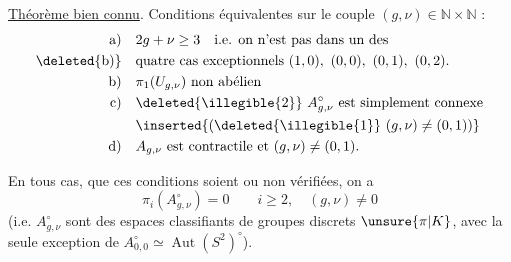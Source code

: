 

\uline{Théorème bien connu}. Conditions équivalentes sur le couple $(g,\nu)\in\mathbb N\times\mathbb N$ :
\[
\begin{aligned}
\text{a)}\quad &2g+\nu\geq3\quad\text{i.e. on n'est pas dans un des}\\
\text{\deleted{b)}}\quad &\text{quatre cas exceptionnels }(1,0),\ (0,0),\ (0,1),\ (0,2).\\
\text{b)}\quad &\pi_1(U_{g,\nu})\text{ non abélien}\\
\text{c)}\quad &\deleted{\illegible{2}}\ A_{g,\nu}^{\circ}\text{ est simplement connexe}\\
&\inserted{\text{(}\deleted{\illegible{1}}\ (g,\nu)\ne(0,1)\text{)}}\\
\text{d)}\quad &A_{g,\nu}\text{ est contractile et }(g,\nu)\ne(0,1).
\end{aligned}
\]

En tous cas, que ces conditions soient ou non vérifiées, on a 
\[
\pi_i(A_{g,\nu}^{\circ})=0\qquad i\geq2,\quad(g,\nu)\ne0
\]
(i.e.  $A_{g,\nu}^{\circ}$ sont des espaces classifiants de groupes discrets $\unsure{\pi|K}$, avec la seule exception de $A_{0,0}^{\circ}\simeq\operatorname{Aut}(S^2)^{\circ}$).

